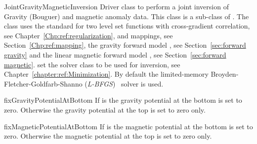\begin{classdesc}{JointGravityMagneticInversion}{
}
Driver class to perform a joint inversion of Gravity (Bouguer) and magnetic anomaly data.
This class is a sub-class of . 
The class uses the standard  for two level set functions
with cross-gradient correlation, see Chapter~\ref{Chp:ref:regularization},
 and  mappings, see Section~\ref{Chp:ref:mapping}, the 
gravity forward model , see Section~\ref{sec:forward gravity}
and the linear
magnetic forward model , see Section~\ref{sec:forward magnetic}.
 set the solver class to be used for inversion,
see Chapter~\ref{chapter:ref:Minimization}.
 By default the limited-memory Broyden-Fletcher-Goldfarb-Shanno (\emph{L-BFGS})~\cite{Nocedal1980} solver is used.
\end{classdesc}

\begin{methoddesc}[JointGravityMagneticInversion]{fixGravityPotentialAtBottom}{}
If  is \True the gravity potential at the bottom is set to zero. Otherwise  the gravity
 potential at the top is set to zero only. 
\end{methoddesc}


\begin{methoddesc}[JointGravityMagneticInversion]{fixMagneticPotentialAtBottom}{}
If  is \True the magnetic potential at the bottom is set to zero. Otherwise  the magnetic
 potential at the top is set to zero only. 
\end{methoddesc}

